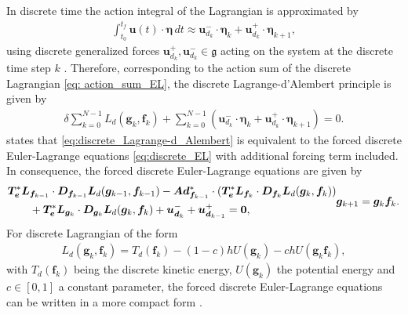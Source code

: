 In discrete time the action integral of the Lagrangian is approximated by 
\begin{align}
    \int_{t_0}^{t_f} \bm{u}(t) \cdot \bm{\eta}\, dt \approx \bm{u}_{d_k}^- \cdot \bm{\eta}_k + \bm{u}_{d_k}^+ \cdot \bm{\eta}_{k+1},
\end{align}
using discrete generalized forces $\bm{u}_{d_k}^{+}, \bm{u}_{d_k}^{-} \in \bm{\mathfrak{g}}$ acting on the system at the discrete time step $k$ \cite{Marsden2001}.
Therefore, corresponding to the action sum of the discrete Lagrangian \eqref{eq: action_sum_EL}, the discrete Lagrange-d'Alembert principle is given by 
\begin{align}\label{eq:discrete_Lagrange-d_Alembert}
    \delta \sum_{k=0}^{N-1} L_d(\bm{g}_k, \bm{f}_k) + \sum_{k=0}^{N-1} \left( \bm{u}_{d_k}^- \cdot \bm{\eta}_k + \bm{u}_{d_k}^+ \cdot \bm{\eta}_{k+1} \right) = 0.
\end{align}
\cite{Lee2008} states that \eqref{eq:discrete_Lagrange-d_Alembert} is equivalent to the forced discrete Euler-Lagrange equations \eqref{eq:discrete_EL} with additional forcing term included. In consequence, 
the forced discrete Euler-Lagrange equations are given by
\begingroup
\small
\begin{subequations}\label{eq:discrete_forced_Euler_Lagrange}
\begin{align}
    \label{eq:discrete_forced_Euler_Lagrange_Dynamics}
    &\bm{T}^*_{\bm{e}}\bm{L}_{\bm{f}_{k-1}} \cdot \bm{D}_{\bm{f}_{k-1}} \bm{L}_d(\bm{g}_{k-1}, \bm{f}_{k-1})
    - \bm{Ad}^*_{\bm{f}_{k-1}} \cdot \left(\bm{T}^*_{\bm{e}}\bm{L}_{\bm{f}_{k}} \cdot \bm{D}_{\bm{f}_{k}}\bm{L}_d(\bm{g}_{k}, \bm{f}_{k})\right) \notag \\
    &\qquad + \bm{T}^*_{\bm{e}}\bm{L}_{\bm{g}_{k}} \cdot \bm{D}_{\bm{g}_{k}} \bm{L}_d(\bm{g}_{k}, \bm{f}_{k})
    + \bm{u}^-_{\bm{d}_{k}} + \bm{u}^+_{\bm{d}_{k-1}} = \bm{0},
\end{align}
\vspace{-1.2\baselineskip}
\begin{equation}\label{eq:discrete_forced_Euler_Lagrange_Kinetics}
    \bm{g}_{k+1} = \bm{g}_{k}\bm{f}_{k}.
\end{equation}
\end{subequations}
\endgroup
For discrete Lagrangian of the form
\begin{align}\label{eq:discrete_lagrangian_forced_special}
    L_d(\bm{g}_k, \bm{f}_k) = T_d(\bm{f}_k) - (1-c)hU(\bm{g}_k) - chU(\bm{g}_k\bm{f}_k),
\end{align}
with $T_d(\bm{f}_k)$ being the discrete kinetic energy, $U(\bm{g}_k)$ the potential energy and $c \in [0,1]$ a constant parameter, the forced discrete Euler-Lagrange equations can be written in a more compact form \cite{Lee2008}.

